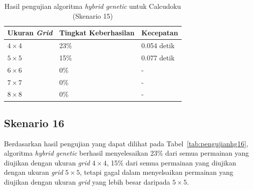 \begin{table}
\centering
\captionsetup{justification=centering}
\caption[Hasil pengujian algoritma \textit{hybrid genetic} untuk Calcudoku (Skenario 15)]{Hasil pengujian algoritma \textit{hybrid genetic} untuk Calcudoku (Skenario 15)}
\begin{tabular}{| l | l | l |}
\hline
Ukuran \textit{Grid} & Tingkat Keberhasilan & Kecepatan \\
\hline \hline
\begin{math}4 \times 4\end{math} & 23\% & 0.054 detik \\
\hline
\begin{math}5 \times 5\end{math} & 15\% & 0.077 detik \\
\hline
\begin{math}6 \times 6\end{math} & 0\% & - \\
\hline
\begin{math}7 \times 7\end{math} & 0\% & - \\
\hline
\begin{math}8 \times 8\end{math} & 0\% & - \\
\hline
\end{tabular}
\label{tab:pengujianhg15}
\end{table}

\subsection{Skenario 16}
\label{sec:skenario16}

Berdasarkan hasil pengujian yang dapat dilihat pada Tabel~\ref{tab:pengujianhg16}, algoritma \textit{hybrid genetic} berhasil menyelesaikan 23\% dari semua permainan yang diujikan dengan ukuran \textit{grid} \begin{math}4 \times 4\end{math}, 15\% dari semua permainan yang diujikan dengan ukuran \textit{grid} \begin{math}5 \times 5\end{math}, tetapi gagal dalam menyelsaikan permainan yang diujikan dengan ukuran \textit{grid} yang lebih besar daripada \begin{math}5 \times 5\end{math}.

